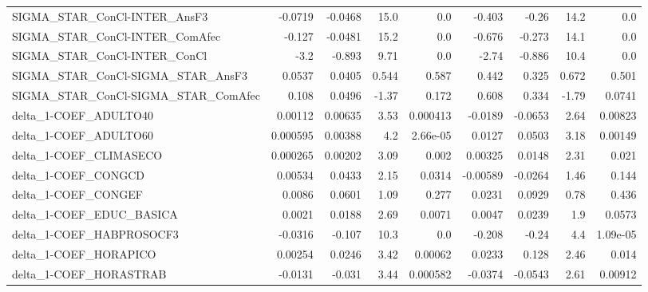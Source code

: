\begin{tabular}{lrrrrrrrr}
SIGMA\_STAR\_ConCl-INTER\_AnsF3        &     -0.0719 &      -0.0468 &    15.0 &      0.0 &     -0.403 &       -0.26 &         14.2 &           0.0 \\
SIGMA\_STAR\_ConCl-INTER\_ComAfec      &      -0.127 &      -0.0481 &    15.2 &      0.0 &     -0.676 &      -0.273 &         14.1 &           0.0 \\
SIGMA\_STAR\_ConCl-INTER\_ConCl        &        -3.2 &       -0.893 &    9.71 &      0.0 &      -2.74 &      -0.886 &         10.4 &           0.0 \\
SIGMA\_STAR\_ConCl-SIGMA\_STAR\_AnsF3   &      0.0537 &       0.0405 &   0.544 &    0.587 &      0.442 &       0.325 &        0.672 &         0.501 \\
SIGMA\_STAR\_ConCl-SIGMA\_STAR\_ComAfec &       0.108 &       0.0496 &   -1.37 &    0.172 &      0.608 &       0.334 &        -1.79 &        0.0741 \\
delta\_1-COEF\_ADULTO40               &     0.00112 &      0.00635 &    3.53 & 0.000413 &    -0.0189 &     -0.0653 &         2.64 &       0.00823 \\
delta\_1-COEF\_ADULTO60               &    0.000595 &      0.00388 &     4.2 & 2.66e-05 &     0.0127 &      0.0503 &         3.18 &       0.00149 \\
delta\_1-COEF\_CLIMASECO              &    0.000265 &      0.00202 &    3.09 &    0.002 &    0.00325 &      0.0148 &         2.31 &         0.021 \\
delta\_1-COEF\_CONGCD                 &     0.00534 &       0.0433 &    2.15 &   0.0314 &   -0.00589 &     -0.0264 &         1.46 &         0.144 \\
delta\_1-COEF\_CONGEF                 &      0.0086 &       0.0601 &    1.09 &    0.277 &     0.0231 &      0.0929 &         0.78 &         0.436 \\
delta\_1-COEF\_EDUC\_BASICA            &      0.0021 &       0.0188 &    2.69 &   0.0071 &     0.0047 &      0.0239 &          1.9 &        0.0573 \\
delta\_1-COEF\_HABPROSOCF3            &     -0.0316 &       -0.107 &    10.3 &      0.0 &     -0.208 &       -0.24 &          4.4 &      1.09e-05 \\
delta\_1-COEF\_HORAPICO               &     0.00254 &       0.0246 &    3.42 &  0.00062 &     0.0233 &       0.128 &         2.46 &         0.014 \\
delta\_1-COEF\_HORASTRAB              &     -0.0131 &       -0.031 &    3.44 & 0.000582 &    -0.0374 &     -0.0543 &         2.61 &       0.00912 \\

\end{tabular}
